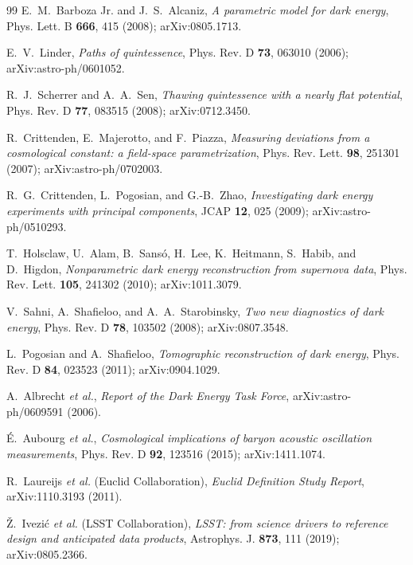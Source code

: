 \documentclass[11pt,reqno]{amsart}
\theoremstyle{plain}
\theoremstyle{definition}
\theoremstyle{remark}
\begin{document}
\begin{thebibliography}{99}
E.~M.~Barboza Jr. and J.~S.~Alcaniz,
\emph{A parametric model for dark energy},
Phys. Lett. B \textbf{666}, 415 (2008); arXiv:0805.1713.

E.~V.~Linder,
\emph{Paths of quintessence},
Phys. Rev. D \textbf{73}, 063010 (2006); arXiv:astro-ph/0601052.

R.~J.~Scherrer and A.~A.~Sen,
\emph{Thawing quintessence with a nearly flat potential},
Phys. Rev. D \textbf{77}, 083515 (2008); arXiv:0712.3450.

R.~Crittenden, E.~Majerotto, and F.~Piazza,
\emph{Measuring deviations from a cosmological constant: a field-space parametrization},
Phys. Rev. Lett. \textbf{98}, 251301 (2007); arXiv:astro-ph/0702003.

R.~G.~Crittenden, L.~Pogosian, and G.-B.~Zhao,
\emph{Investigating dark energy experiments with principal components},
JCAP \textbf{12}, 025 (2009); arXiv:astro-ph/0510293.

T.~Holsclaw, U.~Alam, B.~Sansó, H.~Lee, K.~Heitmann, S.~Habib, and D.~Higdon,
\emph{Nonparametric dark energy reconstruction from supernova data},
Phys. Rev. Lett. \textbf{105}, 241302 (2010); arXiv:1011.3079.

V.~Sahni, A.~Shafieloo, and A.~A.~Starobinsky,
\emph{Two new diagnostics of dark energy},
Phys. Rev. D \textbf{78}, 103502 (2008); arXiv:0807.3548.

L.~Pogosian and A.~Shafieloo,
\emph{Tomographic reconstruction of dark energy},
Phys. Rev. D \textbf{84}, 023523 (2011); arXiv:0904.1029.

A.~Albrecht \emph{et al.},
\emph{Report of the Dark Energy Task Force},
arXiv:astro-ph/0609591 (2006).

\'{E}.~Aubourg \emph{et al.},
\emph{Cosmological implications of baryon acoustic oscillation measurements},
Phys. Rev. D \textbf{92}, 123516 (2015); arXiv:1411.1074.

R.~Laureijs \emph{et al.} (Euclid Collaboration),
\emph{Euclid Definition Study Report},
arXiv:1110.3193 (2011).

\v{Z}.~Ivezi\'{c} \emph{et al.} (LSST Collaboration),
\emph{LSST: from science drivers to reference design and anticipated data products},
Astrophys. J. \textbf{873}, 111 (2019); arXiv:0805.2366.


\end{thebibliography}
\end{document}
